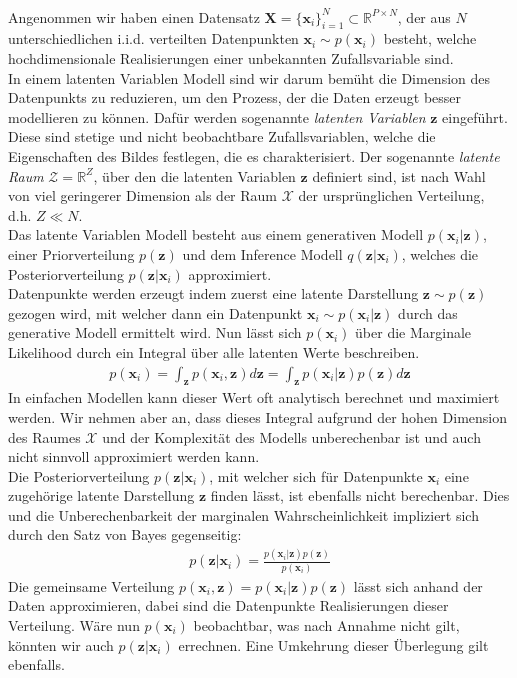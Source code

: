 \documentclass[12pt]{article}
\newcommand{\R}{\mathbb{R}}
\newcommand{\z}{\mathbf{z}}
\newcommand{\x}{\mathbf{x}_i}
\begin{document}
    \	\\
	Angenommen wir haben einen Datensatz $\textbf{X} = \lbrace\x \rbrace_{i=1}^{N} \subset \R^{P\times N}$, der aus $N$ unterschiedlichen i.i.d. verteilten Datenpunkten $\x\sim p(\x)$ besteht, welche hochdimensionale Realisierungen einer unbekannten Zufallsvariable sind.\\
	In einem latenten Variablen Modell sind wir darum bemüht die Dimension des Datenpunkts zu reduzieren, um den Prozess, der die Daten erzeugt besser modellieren zu können.
	Dafür werden sogenannte \emph{latenten Variablen} $\z$ eingeführt. Diese sind stetige und nicht beobachtbare Zufallsvariablen, welche die Eigenschaften des Bildes festlegen, die es charakterisiert.
	Der sogenannte \emph{latente Raum} $\mathcal{Z} = \R^Z$, über den die latenten Variablen $\z$ definiert sind, ist nach Wahl von viel geringerer Dimension als der Raum $\mathcal{X}$ der ursprünglichen Verteilung, d.h. $Z \ll N$.\\
	Das latente Variablen Modell besteht aus einem generativen Modell $p(\x|\z)$, einer Priorverteilung $p(\z)$ und dem Inference Modell $q(\z|\x)$, welches die Posteriorverteilung $p(\z|\x)$ approximiert.\\
	Datenpunkte werden erzeugt indem zuerst eine latente Darstellung $\z \sim  p(\z)$  gezogen wird, mit welcher dann ein Datenpunkt  $\x \sim  p(\x|\z)$ durch das generative Modell ermittelt wird. Nun lässt sich $p(\x)$ über die Marginale Likelihood durch ein Integral über alle latenten Werte beschreiben.
	\begin{align*}
	p(\x)= \int_{\z} p(\x,\z) d\textbf{z} = \int_{\z} p(\x|\z)p(\z) d\z
	\end{align*}
	In einfachen Modellen kann dieser Wert oft analytisch berechnet und maximiert werden.
	Wir nehmen aber an, dass dieses Integral aufgrund der hohen Dimension des Raumes $\mathcal{X}$ und der Komplexität des Modells unberechenbar ist und auch nicht sinnvoll approximiert werden kann.\\
	Die Posteriorverteilung $p(\z|\x)$, mit welcher sich für Datenpunkte $\x$ eine zugehörige latente Darstellung $\z$ finden lässt, ist ebenfalls nicht berechenbar. Dies und die Unberechenbarkeit der marginalen Wahrscheinlichkeit impliziert sich durch den Satz von Bayes gegenseitig:
	\begin{align*}
	p(\z|\x)= \frac{p(\x|\z)p(\z)}{p(\x)}
	\end{align*}
	Die gemeinsame Verteilung $p(\x,\z) = p(\x|\z)p(\z)$ lässt sich anhand der Daten approximieren, dabei sind die Datenpunkte Realisierungen dieser Verteilung. Wäre nun $p(\x)$ beobachtbar, was nach Annahme nicht gilt, könnten wir auch $p(\z|\x)$ errechnen. Eine Umkehrung dieser Überlegung gilt ebenfalls. \\
\end{document}
